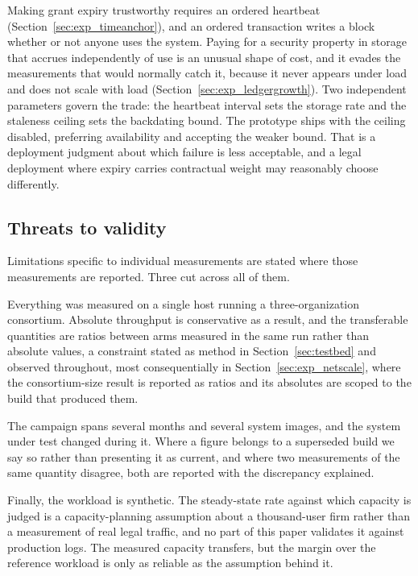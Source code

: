 \documentclass[preprint,12pt]{elsarticle}
\begin{document}
Making grant expiry trustworthy requires an ordered heartbeat
(Section~\ref{sec:exp_timeanchor}), and an ordered transaction writes a block
whether or not anyone uses the system. Paying for a security property in
storage that accrues independently of use is an unusual shape of cost, and it
evades the measurements that would normally catch it, because it never appears
under load and does not scale with load
(Section~\ref{sec:exp_ledgergrowth}). Two
independent parameters govern the trade: the heartbeat interval sets the
storage rate and the staleness ceiling sets the backdating bound. The
prototype ships with the ceiling disabled, preferring availability and accepting
the weaker bound. That is a deployment judgment about which failure is less
acceptable, and a legal deployment where expiry carries contractual weight may
reasonably choose differently.

\subsection{Threats to validity}
\label{sec:validity}

Limitations specific to individual measurements are stated where those
measurements are reported. Three cut across all of them.

Everything was measured on a single host running a three-organization
consortium. Absolute throughput is conservative as a result, and the
transferable quantities are ratios between arms measured in the same run rather
than absolute values, a constraint stated as method in
Section~\ref{sec:testbed} and observed throughout, most consequentially in
Section~\ref{sec:exp_netscale}, where the consortium-size result is reported as
ratios and its absolutes are scoped to the build that produced them.

The campaign spans several months and several system images, and the system
under test changed during it. Where a figure belongs to a superseded build we
say so rather than presenting it as current, and where two measurements of the
same quantity disagree, both are reported with the discrepancy explained.

Finally, the workload is synthetic. The steady-state rate against which
capacity is judged is a capacity-planning assumption about a thousand-user
firm rather than a measurement of real legal traffic, and no part of this
paper validates it against production logs. The measured capacity transfers,
but the margin over the reference workload is only as reliable as the
assumption behind it.
\end{document}
